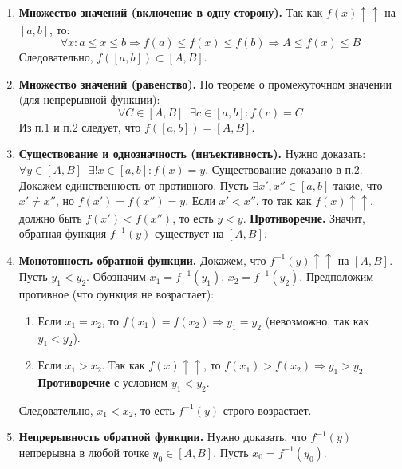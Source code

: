 \begin{tcolorbox}[title=Доказательство, breakable]
    \begin{enumerate}
        \item \textbf{Множество значений (включение в одну сторону).}
        Так как $f(x) \uparrow\uparrow$ на $[a, b]$, то:
        \[ \forall x: a \le x \le b \Rightarrow f(a) \le f(x) \le f(b) \Rightarrow A \le f(x) \le B \]
        Следовательно, $f([a, b]) \subset [A, B]$.

        \item \textbf{Множество значений (равенство).}
        По теореме о промежуточном значении (для непрерывной функции):
        \[ \forall C \in [A, B] \;\; \exists c \in [a, b]: f(c) = C \]
        Из п.1 и п.2 следует, что $f([a, b]) = [A, B]$.

        \item \textbf{Существование и однозначность (инъективность).}
        Нужно доказать: $\forall y \in [A, B] \;\; \exists! x \in [a, b]: f(x) = y$.
        Существование доказано в п.2. Докажем единственность от противного.
        Пусть $\exists x', x'' \in [a, b]$ такие, что $x' \neq x''$, но $f(x') = f(x'') = y$.
        Если $x' < x''$, то так как $f(x) \uparrow\uparrow$, должно быть $f(x') < f(x'')$, то есть $y < y$.
        \textbf{Противоречие.} Значит, обратная функция $f^{-1}(y)$ существует на $[A, B]$.

        \item \textbf{Монотонность обратной функции.}
        Докажем, что $f^{-1}(y) \uparrow\uparrow$ на $[A, B]$.
        Пусть $y_1 < y_2$. Обозначим $x_1 = f^{-1}(y_1)$, $x_2 = f^{-1}(y_2)$.
        Предположим противное (что функция не возрастает):
        \begin{enumerate}
            \item Если $x_1 = x_2$, то $f(x_1) = f(x_2) \Rightarrow y_1 = y_2$ (невозможно, так как $y_1 < y_2$).
            \item Если $x_1 > x_2$. Так как $f(x) \uparrow\uparrow$, то $f(x_1) > f(x_2) \Rightarrow y_1 > y_2$.
            \textbf{Противоречие} с условием $y_1 < y_2$.
        \end{enumerate}
        Следовательно, $x_1 < x_2$, то есть $f^{-1}(y)$ строго возрастает.

        \item \textbf{Непрерывность обратной функции.}
        Нужно доказать, что $f^{-1}(y)$ непрерывна в любой точке $y_0 \in [A, B]$.
        Пусть $x_0 = f^{-1}(y_0)$.


\end{enumerate}
\end{tcolorbox}
